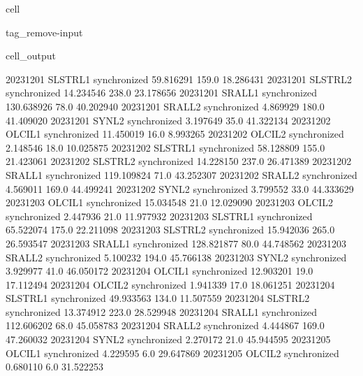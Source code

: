 \documentclass[letterpaper,10pt,english]{jupyterBook}
\begin{document}
\begin{sphinxuseclass}{cell}
\begin{sphinxuseclass}{tag_remove-input}
\begin{sphinxVerbatimOutput}
\begin{sphinxuseclass}{cell_output}
\begin{sphinxVerbatim}[commandchars=\\\{\}]
2023\PYGZhy{}12\PYGZhy{}01     SLSTR\PYGZus{}L1  synchronized   59.816291   159.0   18.286431
2023\PYGZhy{}12\PYGZhy{}01     SLSTR\PYGZus{}L2  synchronized   14.234546   238.0   23.178656
2023\PYGZhy{}12\PYGZhy{}01      SRAL\PYGZus{}L1  synchronized  130.638926    78.0   40.202940
2023\PYGZhy{}12\PYGZhy{}01      SRAL\PYGZus{}L2  synchronized    4.869929   180.0   41.409020
2023\PYGZhy{}12\PYGZhy{}01       SYN\PYGZus{}L2  synchronized    3.197649    35.0   41.322134
2023\PYGZhy{}12\PYGZhy{}02      OLCI\PYGZus{}L1  synchronized   11.450019    16.0    8.993265
2023\PYGZhy{}12\PYGZhy{}02      OLCI\PYGZus{}L2  synchronized    2.148546    18.0   10.025875
2023\PYGZhy{}12\PYGZhy{}02     SLSTR\PYGZus{}L1  synchronized   58.128809   155.0   21.423061
2023\PYGZhy{}12\PYGZhy{}02     SLSTR\PYGZus{}L2  synchronized   14.228150   237.0   26.471389
2023\PYGZhy{}12\PYGZhy{}02      SRAL\PYGZus{}L1  synchronized  119.109824    71.0   43.252307
2023\PYGZhy{}12\PYGZhy{}02      SRAL\PYGZus{}L2  synchronized    4.569011   169.0   44.499241
2023\PYGZhy{}12\PYGZhy{}02       SYN\PYGZus{}L2  synchronized    3.799552    33.0   44.333629
2023\PYGZhy{}12\PYGZhy{}03      OLCI\PYGZus{}L1  synchronized   15.034548    21.0   12.029090
2023\PYGZhy{}12\PYGZhy{}03      OLCI\PYGZus{}L2  synchronized    2.447936    21.0   11.977932
2023\PYGZhy{}12\PYGZhy{}03     SLSTR\PYGZus{}L1  synchronized   65.522074   175.0   22.211098
2023\PYGZhy{}12\PYGZhy{}03     SLSTR\PYGZus{}L2  synchronized   15.942036   265.0   26.593547
2023\PYGZhy{}12\PYGZhy{}03      SRAL\PYGZus{}L1  synchronized  128.821877    80.0   44.748562
2023\PYGZhy{}12\PYGZhy{}03      SRAL\PYGZus{}L2  synchronized    5.100232   194.0   45.766138
2023\PYGZhy{}12\PYGZhy{}03       SYN\PYGZus{}L2  synchronized    3.929977    41.0   46.050172
2023\PYGZhy{}12\PYGZhy{}04      OLCI\PYGZus{}L1  synchronized   12.903201    19.0   17.112494
2023\PYGZhy{}12\PYGZhy{}04      OLCI\PYGZus{}L2  synchronized    1.941339    17.0   18.061251
2023\PYGZhy{}12\PYGZhy{}04     SLSTR\PYGZus{}L1  synchronized   49.933563   134.0   11.507559
2023\PYGZhy{}12\PYGZhy{}04     SLSTR\PYGZus{}L2  synchronized   13.374912   223.0   28.529948
2023\PYGZhy{}12\PYGZhy{}04      SRAL\PYGZus{}L1  synchronized  112.606202    68.0   45.058783
2023\PYGZhy{}12\PYGZhy{}04      SRAL\PYGZus{}L2  synchronized    4.444867   169.0   47.260032
2023\PYGZhy{}12\PYGZhy{}04       SYN\PYGZus{}L2  synchronized    2.270172    21.0   45.944595
2023\PYGZhy{}12\PYGZhy{}05      OLCI\PYGZus{}L1  synchronized    4.229595     6.0   29.647869
2023\PYGZhy{}12\PYGZhy{}05      OLCI\PYGZus{}L2  synchronized    0.680110     6.0   31.522253

\end{sphinxVerbatim}
\end{sphinxuseclass}
\end{sphinxVerbatimOutput}
\end{sphinxuseclass}
\end{sphinxuseclass}
\end{document}
